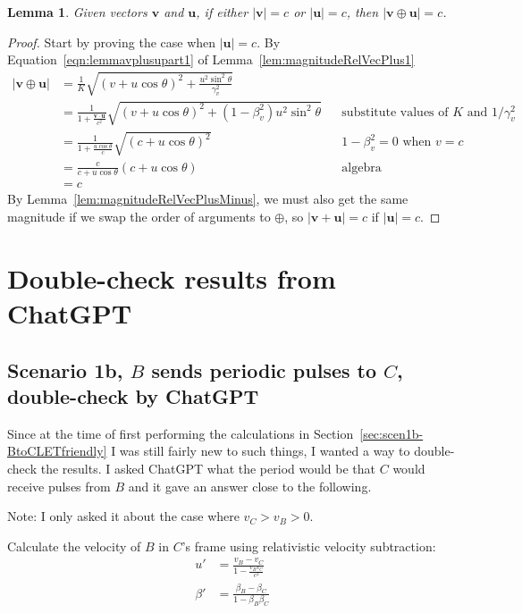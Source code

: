 \documentclass[a4paper]{article}
\theoremstyle{plain}
\newtheorem{lemma}[theorem]{Lemma}
\theoremstyle{definition}
\newcommand{\vect}[1]{\mathbf{#1}}
\begin{document}
\begin{lemma}
\label{lem:magVplusC}
Given vectors $\vect{v}$ and $\vect{u}$,
if either $|\vect{v}|=c$ or $|\vect{u}|=c$,
then $|\vect{v} \oplus \vect{u}|=c$.
\end{lemma}

\begin{proof}
Start by proving the case when $|\vect{u}|=c$.
By Equation~\eqref{eqn:lemmavplusupart1}
of Lemma~\ref{lem:magnitudeRelVecPlus1}
\begin{align*}
|\vect{v} \oplus \vect{u}|
  & = \frac{1}{K} \sqrt{(v + u \cos \theta)^2 + \frac{u^2 \sin^2 \theta}{\gamma_v^2}} \\
  & = \frac{1}{1+\frac{\vect{v} \cdot \vect{u}}{c^2}} \sqrt{(v + u \cos \theta)^2 + (1-\beta_v^2) u^2 \sin^2 \theta} & & \text{substitute values of $K$ and $1/\gamma_v^2$} \\
  & = \frac{1}{1+\frac{u \cos \theta}{c}} \sqrt{(c + u \cos \theta)^2} & & \text{$1-\beta_v^2 = 0$ when $v=c$} \\
  & = \frac{c}{c + u \cos \theta} (c + u \cos \theta) & & \text{algebra} \\
  & = c
\end{align*}
By Lemma~\ref{lem:magnitudeRelVecPlusMinus}, we must also get the same
magnitude if we swap the order of arguments to $\oplus$, so
$|\vect{v}+\vect{u}|=c$ if $|\vect{u}|=c$.
\end{proof}


\section{Double-check results from ChatGPT}


\subsection{Scenario 1b, $B$ sends periodic pulses to $C$, double-check by ChatGPT}
\label{sec:scen1b-BtoCdoublecheck}

Since at the time of first performing the calculations in
Section~\ref{sec:scen1b-BtoCLETfriendly} I was still fairly new to
such things, I wanted a way to double-check the results.  I asked
ChatGPT what the period would be that $C$ would receive pulses from
$B$ and it gave an answer close to the following.

Note: I only asked it about the case where $v_C > v_B > 0$.

Calculate the velocity of $B$ in $C$'s frame using relativistic
velocity subtraction:
\begin{align}
u' & = \frac{v_B - v_C}{1 - \frac{v_B v_C}{c^2}} \\
\beta' & = \frac{\beta_B - \beta_C}{1 - \beta_B \beta_C}
\end{align}
\end{document}
